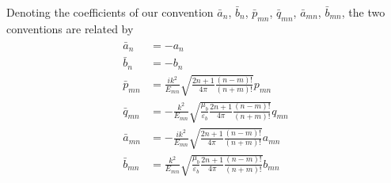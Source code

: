 \documentclass[11pt]{article}
\begin{document}
Denoting the coefficients of our convention $\bar a_n$, $\bar b_n$, $\bar p_{mn}$, $\bar q_{mn}$, $\bar a_{mn}$, $\bar b_{mn}$, the two conventions are related by
\begin{align}
\begin{split}
    \bar a_{n} &= - a_{n} \\
    \bar b_{n} &= - b_{n} \\
    \bar p_{mn} &= \frac{ik^2}{E_{mn}}\sqrt{\frac{2n+1}{4\pi}\frac{(n-m)!}{(n+m)!}} p_{mn} \\
    \bar q_{mn} &= -\frac{k^2}{E_{mn}}\sqrt{\frac{\mu_b}{\varepsilon_b} \frac{2n+1}{4\pi}\frac{(n-m)!}{(n+m)!}} q_{mn} \\
    \bar a_{mn} &= -\frac{ik^2}{E_{mn}}\sqrt{\frac{2n+1}{4\pi}\frac{(n-m)!}{(n+m)!}} a_{mn} \\
    \bar b_{mn} &= \frac{k^2}{E_{mn}}\sqrt{\frac{\mu_b}{\varepsilon_b} \frac{2n+1}{4\pi}\frac{(n-m)!}{(n+m)!}} b_{mn}
\end{split}
\end{align}


{}
\end{document}

